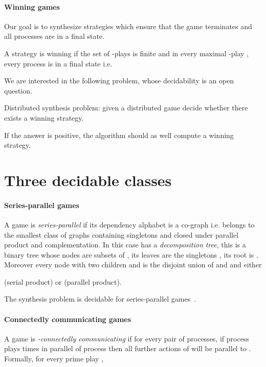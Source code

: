 \documentclass[a4paper,UKenglish]{lipics-v2016}
\begin{document}
 \paragraph*{Winning games}
 
Our goal is to synthesize  strategies
which ensure that the game terminates and 
all processes are in a final state.

\begin{definition}
A strategy  is winning if
the set of -plays  is finite
and in every maximal -play ,
every process is in a final state
i.e. 
\end{definition}
We are interested in the following problem, whose decidability is an open question.
\smallskip

{\noindent \sc Distributed synthesis problem:}
given a distributed game decide
whether  there exists a winning strategy.

\smallskip

If the answer is positive,
the algorithm should as well compute a
winning strategy.




\section{Three decidable classes}
\label{sec:examples}

\paragraph*{Series-parallel games}
A game is \emph{series-parallel} if its dependency alphabet 
is a co-graph i.e. belongs to the smallest class of graphs containing singletons and closed under parallel product and complementation. In this case  has a \emph{decomposition tree},
this is a binary tree whose nodes are subsets of ,
its leaves are the singletons ,
its root is .
Moreover
every node  with two children  and 
 is the disjoint union of  and 
 and either 
 
(serial product)
 or   (parallel product).

The synthesis problem is decidable for series-parallel games~\cite{gastin}.


 
\paragraph*{Connectedly communicating games}
A game is \emph{-connectedly communicating}  if
for every pair  of processes,
 if process  plays  times in parallel of process 
 then all further actions of  will be parallel to .
 Formally, for every prime play ,
\end{document}
